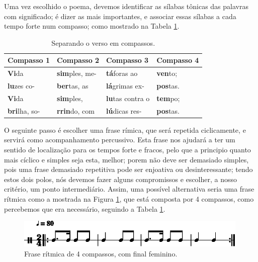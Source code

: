 Uma vez escolhido o poema, 
devemos identificar as sílabas tônicas das palavras com significado;
é dizer as mais importantes, e associar essas sílabas a cada tempo forte num compasso;
como mostrado na Tabela \ref{tab:verso1}.

\begin{table}[h!]
\begin{center}
\begin{tabular}{|l||l||l||l|} %
\hline
Compasso 1 & Compasso 2   & Compasso 3   & Compasso 4 \\ \hline \hline
\textbf{Vi}da       & \textbf{sim}ples, me- & \textbf{tá}foras ao    & \textbf{ven}to;  \\ \hline
\textbf{lu}zes  co- & \textbf{ber}tas, as   & \textbf{lá}grimas ex-  & \textbf{pos}tas. \\ \hline
\textbf{Vi}da       & \textbf{sim}ples, & \textbf{lu}tas contra o & \textbf{tem}po;  \\ \hline
\textbf{bri}lha, so-& \textbf{rrin}do, com   & \textbf{lú}dicas res-  & \textbf{pos}tas. \\ \hline
\end{tabular}
\caption{Separando o verso em compassos.}
\label{tab:verso1}
\end{center}
\end{table}

O seguinte passo é escolher uma frase rímica, que será repetida ciclicamente,
 e servirá como acompanhamento percussivo.
Esta frase nos ajudará a ter um sentido de localização para os tempos forte e fracos,
pelo que a principio quanto mais cíclico e simples seja esta, melhor;
porem não deve ser demasiado simples, 
pois uma frase demasiado repetitiva pode ser enjoativa ou desinteressante;
tendo estos dois polos, 
nós devemos fazer alguns compromissos e escolher, a nosso critério, um ponto intermediário. 
Assim, uma possível alternativa seria uma frase rítmica como a mostrada na Figura \ref{rap:emocional-protesto1},
que está composta por 4 compassos, como percebemos que era necessário, 
seguindo a Tabela \ref{tab:verso1}.

\begin{figure}[H]
\centering
    \centering
    \includegraphics[width=0.99\textwidth]{chapters/cap-musicalidade-tecnica/rap-treino-1-1.eps}
\caption{Frase rítmica de 4 compassos, com final feminino.}
\label{rap:emocional-protesto1}
\end{figure}

